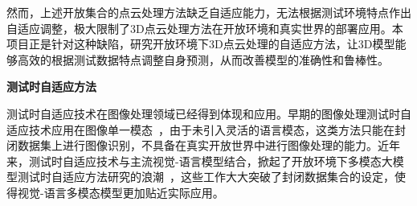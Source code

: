 \documentclass[12pt]{article}
\begin{document}
然而，上述开放集合的点云处理方法缺乏自适应能力，无法根据测试环境特点作出自适应调整，极大限制了3D点云处理方法在开放环境和真实世界的部署应用。本项目正是针对这种缺陷，研究开放环境下3D点云处理的自适应方法，让3D模型能够高效的根据测试数据特点调整自身预测，从而改善模型的准确性和鲁棒性。

\textbf{测试时自适应方法}

测试时自适应技术在图像处理领域已经得到体现和应用。早期的图像处理测试时自适应技术应用在图像单一模态~\cite{liang20shot,liang22source,wang21tent,zhang22memo,sun20ttt,liu21ttt++,gandelsman22ttt-mae,iwasawa21t3a,zhang22memo}，由于未引入灵活的语言模态，这类方法只能在封闭数据集上进行图像识别，不具备在真实开放世界中进行图像处理的能力。近年来，测试时自适应技术与主流视觉-语言模型结合，掀起了开放环境下多模态大模型测试时自适应方法研究的浪潮~\cite{shu22tpt,feng23difftpt,tsai24gda,karmanov24tda,zanella24meanshift,farina24zero,guan2025sca,cha2025snap}，这些工作大大突破了封闭数据集合的设定，使得视觉-语言多模态模型更加贴近实际应用。








\end{document}
